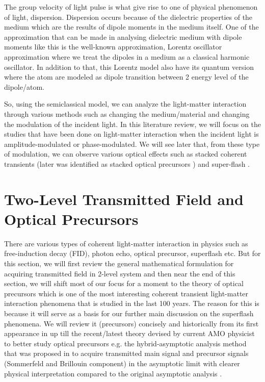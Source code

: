 The group velocity of light pulse is what give rise to one of physical phenomenon of light, dispersion. Dispersion occurs because of the dielectric properties of the medium which are the results of dipole moments in the medium itself. One of the approximation that can be made in analysing dielectric medium with dipole moments like this is the well-known approximation, Lorentz oscillator approximation where we treat the dipoles in a medium as a classical harmonic oscillator. In addition to that, this Lorentz model also have its quantum version where the atom are modeled as dipole transition between 2 energy level of the dipole/atom.

So, using the semiclassical model, we can analyze the light-matter interaction through various methods such as changing the medium/material and changing the modulation of the incident light. In this literature review, we will focus on the studies that have been done on light-matter interaction when the incident light is amplitude-modulated or phase-modulated. We will see later that, from these type of modulation, we can observe various optical effects such as stacked coherent transients \cite{Segard_1987} (later was identified as stacked optical precursors \cite{jeong2010slow}) and super-flash \cite{Kwong2014}.


\section{Two-Level Transmitted Field and Optical Precursors}
There are various types of coherent light-matter interaction in physics such as free-induction decay (FID), photon echo, optical precursor, superflash etc. But for this section, we will first review the general mathematical formulation for acquiring transmitted field in 2-level system and then near the end of this section, we will shift most of our focus for a moment to the theory of optical precursors which is one of the most interesting coherent transient light-matter interaction phenomena that is studied in the last 100 years. The reason for this is because it will serve as a basis for our further main discussion on the superflash phenomena. We will review it (precursors) concisely and historically from its first appearance in \cite{Sommerfeld1914, Brillouin1914} up till the recent/latest theory devised by current AMO physicist to better study optical precursors e.g. the hybrid-asymptotic analysis method that was proposed in \cite{Jeong2009} to acquire transmitted main signal and precursor signals (Sommerfeld and Brillouin component) in the asymptotic limit with clearer physical interpretation compared to the original asymptotic analysis \cite{Sherman1981}.

